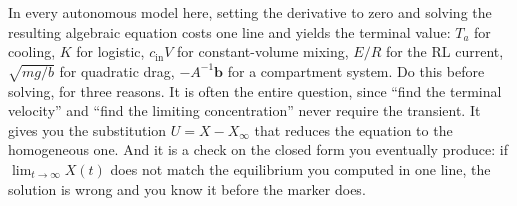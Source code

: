 \begin{keynote}
In every autonomous model here, setting the derivative to zero and solving the resulting algebraic equation costs one line and yields the terminal value: $T_a$ for cooling, $K$ for logistic, $c_{\text{in}}V$ for constant-volume mixing, $E/R$ for the RL current, $\sqrt{mg/b}$ for quadratic drag, $-A^{-1}\mathbf b$ for a compartment system. Do this before solving, for three reasons. It is often the entire question, since ``find the terminal velocity'' and ``find the limiting concentration'' never require the transient. It gives you the substitution $U=X-X_\infty$ that reduces the equation to the homogeneous one. And it is a check on the closed form you eventually produce: if $\lim_{t\to\infty}X(t)$ does not match the equilibrium you computed in one line, the solution is wrong and you know it before the marker does.
\end{keynote}

